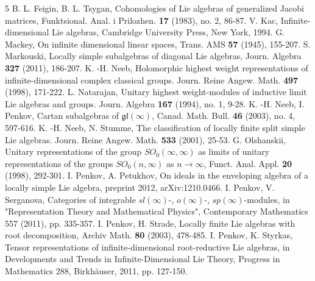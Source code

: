 \documentclass[10pt]{amsart}
\newcommand{\gl}{\mathfrak{gl}}
\begin{document}
\begin{thebibliography}{5}
\vspace{0.2cm}
 B. L. Feigin, B. L. Tsygan, Cohomologies of Lie algebras of generalized Jacobi matrices, Funktsional. Anal. i Prilozhen. \textbf{17} (1983), no. 2, 86-87.
\vspace{0.2cm}
 V. Kac, Infinite-dimensional Lie algebras, Cambridge University Press, New York, 1994. 
\vspace{0.2cm}
  G. Mackey, On infinite dimensional linear spaces, Trans. AMS \textbf{57} (1945), 155-207.
\vspace{0.2cm}
 S. Markouski, Locally simple subalgebras of diagonal Lie algebras, Journ. Algebra \textbf{327} (2011), 186-207.
\vspace{0.2cm}
 K. -H. Neeb, Holomorphic highest weight representations of infinite-dimensional complex classical groups. Journ. Reine Angew. Math. \textbf{497} (1998), 171-222.
\vspace{0.2cm}
 L. Natarajan, Unitary highest weight-modules of inductive limit Lie algebras and groups. Journ. Algebra \textbf{167} (1994), no. 1, 9-28.
\vspace{0.2cm}
 K. -H. Neeb, I. Penkov, Cartan subalgebras of $\gl(\infty)$, Canad. Math. Bull. \textbf{46} (2003), no. 4, 597-616.
\vspace{0.2cm}
 K. -H. Neeb, N. Stumme, The classification of locally finite split simple Lie algebras. Journ. Reine Angew. Math. \textbf{533} (2001), 25-53.
\vspace{0.2cm}
 G. Olshanskii, Unitary representations of the group $SO_0(\infty,\infty)$ as limits of unitary representations of the groups $SO_0(n,\infty)$ as $n \rightarrow \infty$, Funct. Anal. Appl. \textbf{20} (1998), 292-301.
\vspace{0.2cm}
  I. Penkov, A. Petukhov, On ideals in the enveloping algebra of a locally simple Lie algebra, preprint 2012, arXiv:1210.0466.
\vspace{0.2cm}
 I. Penkov, V. Serganova, Categories of integrable $sl(\infty)$-, $o(\infty)$-, $sp(\infty)$-modules, in "Representation Theory and Mathematical Physics", Contemporary Mathematics 557 (2011), pp. 335-357.
\vspace{0.2cm}
 I. Penkov, H. Strade, Locally finite Lie algebras with root decomposition, Archiv Math. \textbf{80} (2003), 478-485. 
\vspace{0.2cm}
 I. Penkov, K. Styrkas, Tensor representations of infinite-dimensional root-reductive Lie algebras, in Developments and Trends in Infinite-Dimensional Lie Theory, Progress in Mathematics 288, Birkh\"auser, 2011, pp. 127-150.

\end{thebibliography}
\end{document}

